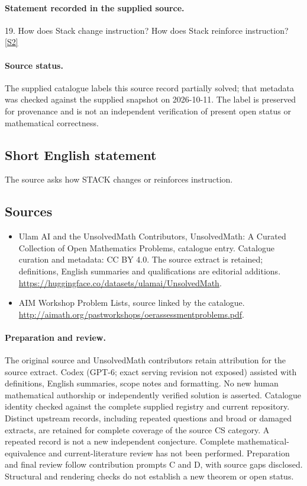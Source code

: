 \documentclass[11pt]{article}
\begin{document}
\paragraph{Statement recorded in the supplied source.}
19. How does Stack change instruction? How does Stack reinforce instruction? \href{http://aimath.org/pastworkshops/oerassessmentproblems.pdf}{[S2]}
\paragraph{Source status.}
The supplied catalogue labels this source record partially solved; that metadata was checked against the supplied snapshot on 2026-10-11. The label is preserved for provenance and is not an independent verification of present open status or mathematical correctness.
\subsection{Short English statement}
The source asks how STACK changes or reinforces instruction.
\subsection{Sources}
\begin{itemize}
\item[S1] Ulam AI and the UnsolvedMath Contributors, UnsolvedMath: A Curated Collection of Open Mathematics Problems, catalogue entry. Catalogue curation and metadata: CC BY 4.0. The source extract is retained; definitions, English summaries and qualifications are editorial additions.
\url{https://huggingface.co/datasets/ulamai/UnsolvedMath}.
\item[S2] AIM Workshop Problem Lists, source linked by the catalogue.
\url{http://aimath.org/pastworkshops/oerassessmentproblems.pdf}.
\end{itemize}
\paragraph{Preparation and review.}
The original source and UnsolvedMath contributors retain attribution for the source extract. Codex (GPT-6; exact serving revision not exposed) assisted with definitions, English summaries, scope notes and formatting. No new human mathematical authorship or independently verified solution is asserted. Catalogue identity checked against the complete supplied registry and current repository. Distinct upstream records, including repeated questions and broad or damaged extracts, are retained for complete coverage of the source CS category. A repeated record is not a new independent conjecture. Complete mathematical-equivalence and current-literature review has not been performed. Preparation and final review follow contribution prompts C and D, with source gaps disclosed. Structural and rendering checks do not establish a new theorem or open status.
\label{end:statement}
\end{document}
